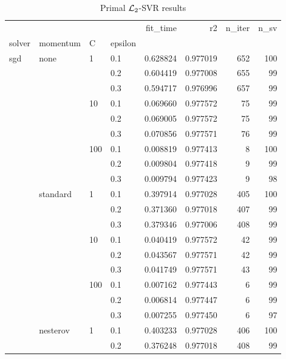 \begin{table}[H]
\centering
\caption{Primal $\protect \mathcal{L}_2$-SVR results}
\label{primal_l2_svr_cv_results}
\begin{tabular}{llllrrrr}
\toprule
          &   &     &     &  fit\_time &        r2 &  n\_iter &  n\_sv \\
solver & momentum & C & epsilon &           &           &         &       \\
\midrule
sgd & none & 1   & 0.1 &  0.628824 &  0.977019 &     652 &   100 \\
          &   &     & 0.2 &  0.604419 &  0.977008 &     655 &    99 \\
          &   &     & 0.3 &  0.594717 &  0.976996 &     657 &    99 \\
          &   & 10  & 0.1 &  0.069660 &  0.977572 &      75 &    99 \\
          &   &     & 0.2 &  0.069005 &  0.977572 &      75 &    99 \\
          &   &     & 0.3 &  0.070856 &  0.977571 &      76 &    99 \\
          &   & 100 & 0.1 &  0.008819 &  0.977413 &       8 &   100 \\
          &   &     & 0.2 &  0.009804 &  0.977418 &       9 &    99 \\
          &   &     & 0.3 &  0.009794 &  0.977423 &       9 &    98 \\
          & standard & 1   & 0.1 &  0.397914 &  0.977028 &     405 &   100 \\
          &   &     & 0.2 &  0.371360 &  0.977018 &     407 &    99 \\
          &   &     & 0.3 &  0.379346 &  0.977006 &     408 &    99 \\
          &   & 10  & 0.1 &  0.040419 &  0.977572 &      42 &    99 \\
          &   &     & 0.2 &  0.043567 &  0.977571 &      42 &    99 \\
          &   &     & 0.3 &  0.041749 &  0.977571 &      43 &    99 \\
          &   & 100 & 0.1 &  0.007162 &  0.977443 &       6 &    99 \\
          &   &     & 0.2 &  0.006814 &  0.977447 &       6 &    99 \\
          &   &     & 0.3 &  0.007255 &  0.977450 &       6 &    97 \\
          & nesterov & 1   & 0.1 &  0.403233 &  0.977028 &     406 &   100 \\
          &   &     & 0.2 &  0.376248 &  0.977018 &     408 &    99 \\

\end{tabular}
\end{table}
